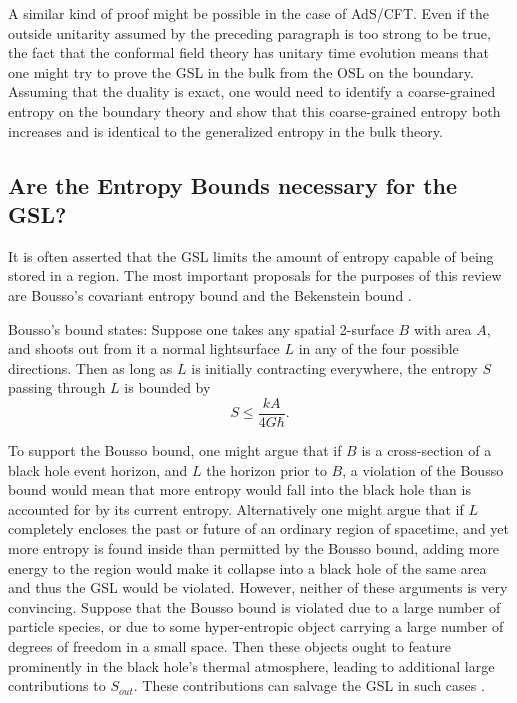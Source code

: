 \documentclass{article}
\begin{document}
A similar kind of proof might be possible in the case of AdS/CFT.  Even if the outside unitarity assumed by the preceding paragraph is too strong to be true, the fact that the conformal field theory has unitary time evolution means that one might try to prove the GSL in the bulk from the OSL on the boundary.  Assuming that the duality is exact, one would need to identify a coarse-grained entropy on the boundary theory and show that this coarse-grained entropy both increases and is identical to the generalized entropy in the bulk theory.

\subsection{Are the Entropy Bounds necessary for the GSL?}\label{bounds}

It is often asserted that the GSL limits the amount of entropy capable of being stored in a region.  The most important proposals for the purposes of this review are Bousso's covariant entropy bound \cite{bousso99} and the Bekenstein bound \cite{bek81}.

Bousso's bound states:  Suppose one takes any spatial 2-surface $B$ with area $A$, and shoots out from it a normal lightsurface $L$ in any of the four possible directions.  Then as long as $L$ is initially contracting everywhere, the entropy $S$ passing through $L$ is bounded by
\begin{equation}
S \le \frac{kA}{4G\hbar}.
\end{equation}

To support the Bousso bound, one might argue that if $B$ is a cross-section of a black hole event horizon, and $L$ the horizon prior to $B$, a violation of the Bousso bound would mean that more entropy would fall into the black hole than is accounted for by its current entropy.  Alternatively one might argue that if $L$ completely encloses the past or future of an ordinary region of spacetime, and yet more entropy is found inside than permitted by the Bousso bound, adding more energy to the region would make it collapse into a black hole of the same area and thus the GSL would be violated.  However, neither of these arguments is very convincing.  Suppose that the Bousso bound is violated due to a large number of particle species, or due to some hyper-entropic object carrying a large number of degrees of freedom in a small space.  Then these objects ought to feature prominently in the black hole's thermal atmosphere, leading to additional large contributions to $S_{out}$.  These contributions can salvage the GSL in such cases \cite{MS03}.
\end{document}
